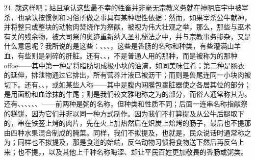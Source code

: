 24. 就这样吧；姑且承认这些最不幸的牲畜并非毫无宗教义务就在神明庙宇中被宰杀，也承认按惯例和习俗所做之事具有某种理性依据：然而，如果宰杀公牛献神，并将整只或整块的动物肉焚烧作为祭献，被视为伟大壮观之举，那么，那些与巫术有关的残余物，被大司祭的奥迹重新纳入圣礼秘法之中，并与宗教事务掺杂，又是什么意思呢？我所说的是这些：、、、，这些是香肠的名称和种类，有些灌满山羊血，有些则是剁碎的肝脏。还有、、，不是普通人用的那种，而是被称为的那种offoe——其中第一种是将脂肪切成极小块的油渣，如同美味佳肴；第二种是肠衣的延伸，排泄物通过它排出，所有营养汁液已被沥干；而则是兽尾连同一小块肉被切下。还有、、，或如某些人称——其中是腹内网膜包裹脏器使之各居其位的部分；是用面粉和血涂抹的牛尾；则是我们较文雅地称之为的部分，而俗人通常称其为。还有、、、、、、——前两种是粥的名称，但种类和性质不同；后面一连串名称指献祭的糕饼，因为它们并非以同一种方式制作。因为我们不打算提及从公牛后腿取下的，串在铁签上烤的肉片，先在火上加热然后在炽炭上焙烤的肠子，最后也不提那由四种水果混合制成的腌菜。同样，我们不拟提及，也就是，民众说话时通常称之为；同样也不拟提及，那是食道的始端，反刍动物习惯将食物送下然后再反刍上来；也不提，，以及其他上千种名称晦涩、却让平民百姓更加敬畏的香肠或粥类。\par

